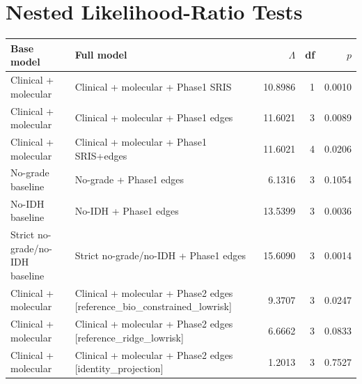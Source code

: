 \documentclass[11pt]{article}
\begin{document}
\section{Nested Likelihood-Ratio Tests}
\begin{longtable}{p{}p{}rrr}
\toprule
Base model & Full model & $\Lambda$ & df & $p$\\
\midrule
Clinical + molecular & Clinical + molecular + Phase1 SRIS & 10.8986 & 1 & 0.0010\\
Clinical + molecular & Clinical + molecular + Phase1 edges & 11.6021 & 3 & 0.0089\\
Clinical + molecular & Clinical + molecular + Phase1 SRIS+edges & 11.6021 & 4 & 0.0206\\
No-grade baseline & No-grade + Phase1 edges & 6.1316 & 3 & 0.1054\\
No-IDH baseline & No-IDH + Phase1 edges & 13.5399 & 3 & 0.0036\\
Strict no-grade/no-IDH baseline & Strict no-grade/no-IDH + Phase1 edges & 15.6090 & 3 & 0.0014\\
Clinical + molecular & Clinical + molecular + Phase2 edges [reference\_bio\_constrained\_lowrisk] & 9.3707 & 3 & 0.0247\\
Clinical + molecular & Clinical + molecular + Phase2 edges [reference\_ridge\_lowrisk] & 6.6662 & 3 & 0.0833\\
Clinical + molecular & Clinical + molecular + Phase2 edges [identity\_projection] & 1.2013 & 3 & 0.7527\\
\bottomrule
\end{longtable}
\end{document}
